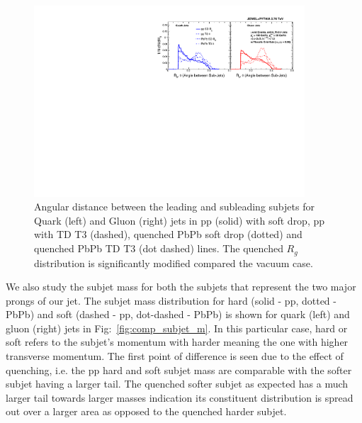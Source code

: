 \documentclass[notoc]{JHEP3}
\begin{document}
\begin{figure}[h]
	   \centering
	   \includegraphics[width=0.9\textwidth]{plots/Comp_rg.pdf}
	   \caption{Angular distance between the leading and subleading subjets for Quark (left) and Gluon (right) jets in pp (solid) with soft drop, pp with TD T3 (dashed), quenched PbPb soft drop (dotted) and quenched PbPb TD T3 (dot dashed) lines. The quenched $R_{g}$ distribution is significantly modified compared the vacuum case.}
\label{fig:comp_rg}
\end{figure}

We also study the subjet mass for both the subjets that represent the two major prongs of our jet. The subjet mass distribution for hard (solid - pp, dotted - PbPb) and soft (dashed - pp, dot-dashed - PbPb) is shown for quark (left) and gluon (right) jets in Fig:~\ref{fig:comp_subjet_m}. In this particular case, hard or soft refers to the subjet's momentum with harder meaning the one with higher transverse momentum. The first point of difference is seen due to the effect of quenching, i.e. the pp hard and soft subjet mass are comparable with the softer subjet having a larger tail. The quenched softer subjet as expected has a much larger tail towards larger masses indication its constituent distribution is spread out over a larger area as opposed to the quenched harder subjet.  
\end{document}
